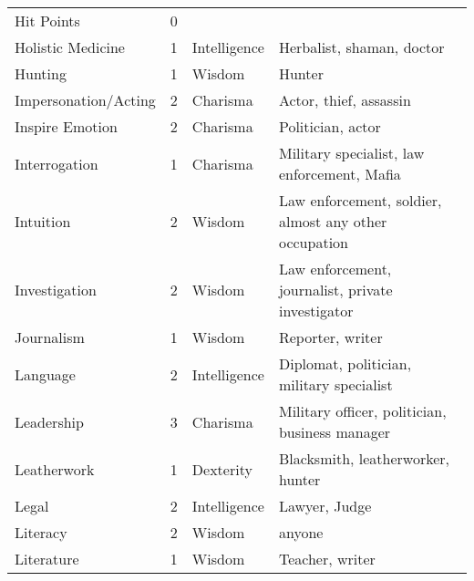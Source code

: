 \documentclass[twoside]{book}
\begin{document}
\begin{longtable}{p{1.25in}llp{12em}}
  \raggedright
           Hit Points 
  &
   0 
  &
  
  \tabularnewline
      
  \raggedright
           Holistic Medicine 
  &
   1 
  &
   Intelligence 
  &
   Herbalist, shaman, doctor
           
  \tabularnewline
      
  \raggedright
           Hunting 
  &
   1 
  &
   Wisdom 
  &
   Hunter 
  \tabularnewline
      
  \raggedright
           Impersonation/Acting 
  &
   2 
  &
   Charisma 
  &
   Actor, thief, assassin
           
  \tabularnewline
      
  \raggedright
           Inspire Emotion 
  &
   2 
  &
   Charisma 
  &
   Politician, actor
           
  \tabularnewline
      
  \raggedright
           Interrogation 
  &
   1 
  &
   Charisma 
  &
   Military specialist, law
           enforcement, Mafia 
  \tabularnewline
      
  \raggedright
           Intuition 
  &
   2 
  &
   Wisdom 
  &
   Law enforcement, soldier,
           almost any other occupation 
  \tabularnewline
      
  \raggedright
           Investigation 
  &
   2 
  &
   Wisdom 
  &
   Law enforcement,
           journalist, private investigator 
  \tabularnewline
      
  \raggedright
           Journalism 
  &
   1 
  &
   Wisdom 
  &
   Reporter, writer 
  \tabularnewline
      
  \raggedright
           Language 
  &
   2 
  &
   Intelligence 
  &
   Diplomat, politician,
           military specialist 
  \tabularnewline
      
  \raggedright
           Leadership 
  &
   3 
  &
   Charisma 
  &
   Military officer,
           politician, business manager 
  \tabularnewline
      
  \raggedright
           Leatherwork 
  &
   1 
  &
   Dexterity 
  &
   Blacksmith,
           leatherworker, hunter 
  \tabularnewline
      
  \raggedright
           Legal 
  &
   2 
  &
   Intelligence 
  &
   Lawyer, Judge 
  \tabularnewline
      
  \raggedright
           Literacy 
  &
   2 
  &
   Wisdom 
  &
   anyone 
  \tabularnewline
      
  \raggedright
           Literature 
  &
   1 
  &
   Wisdom 
  &
   Teacher, writer 
  \tabularnewline
      

\end{longtable}
\end{document}

